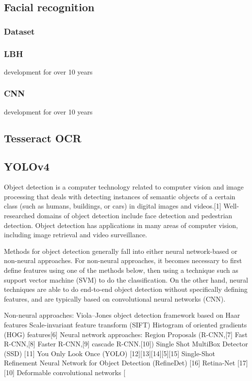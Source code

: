 {\subsection{Facial recognition}
\subsubsection{Dataset}

\subsubsection{LBH}
development for over 10 years
\subsubsection{CNN}
development for over 10 years
\subsection{Tesseract OCR}
\subsection{YOLOv4}
Object detection is a computer technology related to computer vision and image processing that deals with detecting instances of semantic objects of a certain class (such as humans, buildings, or cars) in digital images and videos.[1] Well-researched domains of object detection include face detection and pedestrian detection. Object detection has applications in many areas of computer vision, including image retrieval and video surveillance.

Methods for object detection generally fall into either neural network-based or non-neural approaches. For non-neural approaches, it becomes necessary to first define features using one of the methods below, then using a technique such as support vector machine (SVM) to do the classification. On the other hand, neural techniques are able to do end-to-end object detection without specifically defining features, and are typically based on convolutional neural networks (CNN).

Non-neural approaches:
Viola–Jones object detection framework based on Haar features
Scale-invariant feature transform (SIFT)
Histogram of oriented gradients (HOG) features[6]
Neural network approaches:
Region Proposals (R-CNN,[7] Fast R-CNN,[8] Faster R-CNN,[9] cascade R-CNN.[10])
Single Shot MultiBox Detector (SSD) [11]
You Only Look Once (YOLO) [12][13][14][5][15]
Single-Shot Refinement Neural Network for Object Detection (RefineDet) [16]
Retina-Net [17][10]
Deformable convolutional networks [

}
